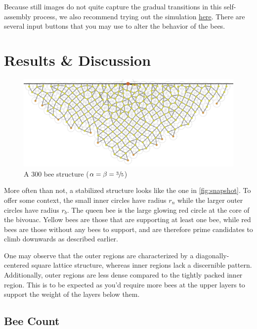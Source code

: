 \documentclass[a4paper,10pt]{article}
\begin{document}
\begin{multicols}{2}
    Because still images do not quite capture the gradual transitions in this self-assembly
    process, we also recommend trying out the simulation \href{https://anacc22.github.io/URECA_Bee_Simulation/}{here}.
    There are several input buttons that you may use to alter the behavior of the bees.

    \section{Results \& Discussion}

    \begin{figure}[H]
        \centering
        \includegraphics[width=\linewidth]{crawl_0.6_climb_0.6_size_0_mass_0_cnt_300.pdf}
        \caption{A $300$ bee structure ($\alpha = \beta = \sfrac{3}{5}$)}
        \label{fig:snapshot}
    \end{figure}

    More often than not, a stabilized structure looks like the one in \autoref{fig:snapshot}.
    To offer some context, the small inner circles have radius $r_{n}$ while the larger outer circles
    have radius $r_{b}$. The queen bee is the large glowing red circle at the core of the bivouac.
    Yellow bees are those that are supporting at least one bee, while red bees are those without
    any bees to support, and are therefore prime candidates to climb downwards as described earlier.

    One may observe that the outer regions are characterized by a diagonally-centered square
    lattice structure, whereas inner regions lack a discernible pattern. Additionally, outer
    regions are less dense compared to the tightly packed inner region. This is to be expected
    as you'd require more bees at the upper layers to support the weight of the layers below them.

    \subsection{Bee Count} \label{section:bee_count}


\end{multicols}
\end{document}
